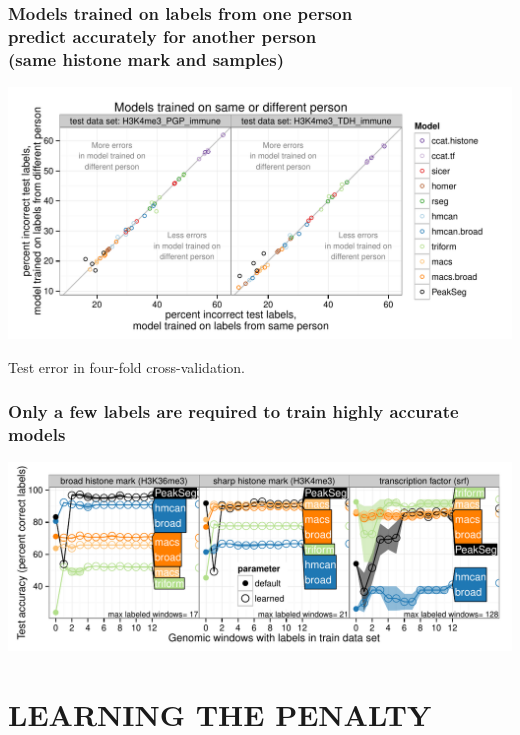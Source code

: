 \documentclass{beamer}
\begin{document}
\begin{frame}
  \frametitle{Models trained on labels from one person\\
predict accurately for another person\\
    (same histone mark and samples)}
  \includegraphics[width=1.1\textwidth]{figure-test-H3K4me3-annotators.pdf}

  Test error in four-fold cross-validation.
\end{frame}

\begin{frame}
  \frametitle{Only a few labels are required to train highly accurate models}
  \includegraphics[width=1.1\textwidth]{figure-test-error-decreases-mean.pdf}
\end{frame}

\section{LEARNING THE PENALTY}
\end{document}
